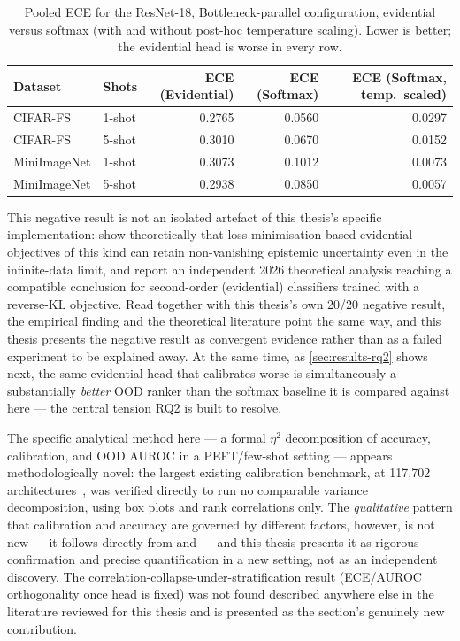 \documentclass{iutbscthesis}
\begin{document}
\begin{table}[H]
    \centering
    \small
    \begin{tabular}{llrrr}
        \toprule
        Dataset & Shots & ECE (Evidential) & ECE (Softmax) & ECE (Softmax, temp.\ scaled) \\
        \midrule
        CIFAR-FS & 1-shot & 0.2765 & 0.0560 & 0.0297 \\
        CIFAR-FS & 5-shot & 0.3010 & 0.0670 & 0.0152 \\
        MiniImageNet & 1-shot & 0.3073 & 0.1012 & 0.0073 \\
        MiniImageNet & 5-shot & 0.2938 & 0.0850 & 0.0057 \\
        \bottomrule
    \end{tabular}
    \caption{Pooled ECE for the ResNet-18, Bottleneck-parallel configuration, evidential versus softmax (with and without post-hoc temperature scaling). Lower is better; the evidential head is worse in every row.}
    \label{tab:head-ece-subset}
\end{table}

This negative result is not an isolated artefact of this thesis's specific implementation: \textcite{bengs2022pitfalls} show theoretically that loss-minimisation-based evidential objectives of this kind can retain non-vanishing epistemic uncertainty even in the infinite-data limit, and \textcite{hoarau2026epistemic} report an independent 2026 theoretical analysis reaching a compatible conclusion for second-order (evidential) classifiers trained with a reverse-KL objective. Read together with this thesis's own 20/20 negative result, the empirical finding and the theoretical literature point the same way, and this thesis presents the negative result as convergent evidence rather than as a failed experiment to be explained away. At the same time, as \autoref{sec:results-rq2} shows next, the same evidential head that calibrates worse is simultaneously a substantially \emph{better} OOD ranker than the softmax baseline it is compared against here — the central tension RQ2 is built to resolve.

The specific analytical method here — a formal $\eta^2$ decomposition of accuracy, calibration, and OOD AUROC in a PEFT/few-shot setting — appears methodologically novel: the largest existing calibration benchmark, at 117{,}702 architectures~\cite{tao2024benchmarkcalibration}, was verified directly to run no comparable variance decomposition, using box plots and rank correlations only. The \emph{qualitative} pattern that calibration and accuracy are governed by different factors, however, is not new — it follows directly from \textcite{guo2017calibration} and \textcite{minderer2021revisiting} — and this thesis presents it as rigorous confirmation and precise quantification in a new setting, not as an independent discovery. The correlation-collapse-under-stratification result (ECE/AUROC orthogonality once head is fixed) was not found described anywhere else in the literature reviewed for this thesis and is presented as the section's genuinely new contribution.
\end{document}
